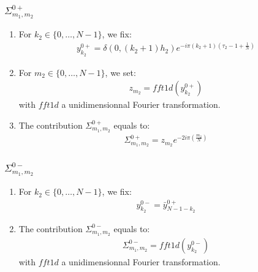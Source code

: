 \subsubsection{$\Sigma_{m_1,m_2}^{0+}$}
\begin{enumerate}
\item For $k_2\in\{0,\hdots,N-1\}$, we fix:
\begin{align*}
y^{0+}_{k_2}= \delta(0,(k_2+1)h_2)e^{-i\pi (k_2+1)\left(\tau_2-1+\frac{1}{N}\right)}
\end{align*}
\item For $m_2\in\{0,\hdots,N-1\}$, we set:
\begin{align*}
  z_{m_2}=fft1d(y^{0+}_{k_2})
\end{align*}
with $fft1d$ a unidimensionnal Fourier transformation.
\item The contribution $\Sigma_{m_1,m_2}^{0+}$ equals to:
\begin{align*}
  \Sigma_{m_1,m_2}^{0+}=z_{m_2}e^{-2i\pi\left(\frac{m_2}{N}\right)}
\end{align*}
\end{enumerate}

\subsubsection{$\Sigma_{m_1,m_2}^{0-}$}
\begin{enumerate}
\item For $k_2\in\{0,\hdots,N-1\}$, we fix:
\begin{align*}
y^{0-}_{k_2}= \bar{y}^{0+}_{N-1-k_2}
\end{align*}
\item The contribution $\Sigma_{m_1,m_2}^{0-}$ equals to:
\begin{align*}
  \Sigma_{m_1,m_2}^{0-}=fft1d(y^{0-}_{k_2})
\end{align*}
with $fft1d$ a unidimensionnal Fourier transformation.
\end{enumerate}

